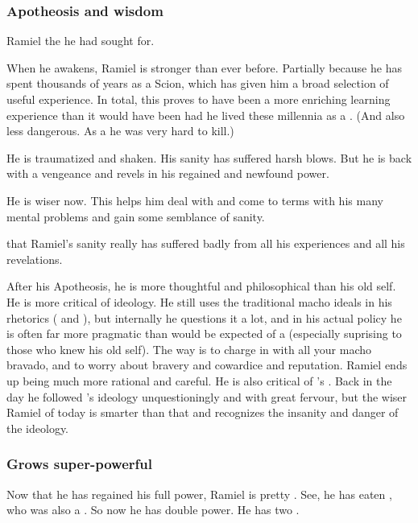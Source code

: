 \subsubsection{Apotheosis and wisdom}
Ramiel  the  he had sought for. 

When he awakens, Ramiel is stronger than ever before. 
Partially because he has spent thousands of years  as a Scion, which has given him a broad selection of useful experience. 
In total, this proves to have been a more enriching learning experience than it would have been had he lived these millennia as a \resphan. 
(And also less dangerous.
As a \malach he was very hard to kill.)

He is traumatized and shaken. 
His sanity has suffered harsh blows.
But he is back with a vengeance and revels in his regained and newfound power.

He is wiser now. 
This helps him deal with and come to terms with his many mental problems and gain some semblance of sanity. 

 that Ramiel's sanity really has suffered badly from all his experiences and all his revelations.

After his Apotheosis, he is more thoughtful and philosophical than his old self. 
He is more critical of \Mystraacht ideology. 
He still uses the traditional \Mystraacht macho ideals in his rhetorics ( and ), but internally he questions it a lot, and in his actual policy he is often far more pragmatic than would be expected of a \Mystraacht (especially suprising to those who knew his old self). 
The \Mystraacht way is to charge in with all your macho bravado, and to worry about bravery and cowardice and reputation. 
Ramiel ends up being much more rational and careful.
He is also critical of \Zachirah's . 
Back in the day he followed \Zachirah's ideology unquestioningly and with great fervour, but the wiser Ramiel of today is smarter than that and recognizes the insanity and danger of the ideology. 





\subsubsection{Grows super-powerful}
Now that he has regained his full \sathariah{} power, Ramiel is pretty \uber. 
See, he has eaten \Belzir, who was also a \sathariah. 
So now he has double \sathariah{} power. 
He has two . 

